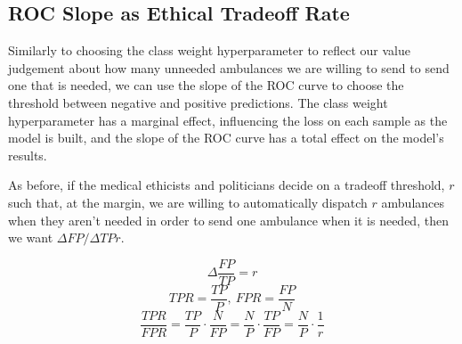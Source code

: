 \subsection{ROC Slope as Ethical Tradeoff Rate}

Similarly to choosing the class weight hyperparameter to reflect our value judgement about how many unneeded ambulances we are willing to send to send one that is needed, we can use the slope of the ROC curve to choose the threshold between negative and positive predictions.  The class weight hyperparameter has a marginal effect, influencing the loss on each sample as the model is built, and the slope of the ROC curve has a total effect on the model's results.  

As before, if the medical ethicists and politicians decide on a tradeoff threshold, $r$ such that, at the margin, we are willing to automatically dispatch $r$ ambulances when they aren't needed in order to send one ambulance when it is needed, then we want $\Delta FP/\Delta TP  r$.  

$$\Delta\frac{FP}{TP} = r $$
$$TPR = \frac{TP}{P}, \ FPR = \frac{FP}{N}$$
$$\frac{TPR}{FPR} 
	= \frac{TP}{P} \cdot \frac{N}{FP} 
	= \frac{N}{P} \cdot \frac{TP}{FP} 
	= \frac{N}{P} \cdot \frac{1}{r}
$$
